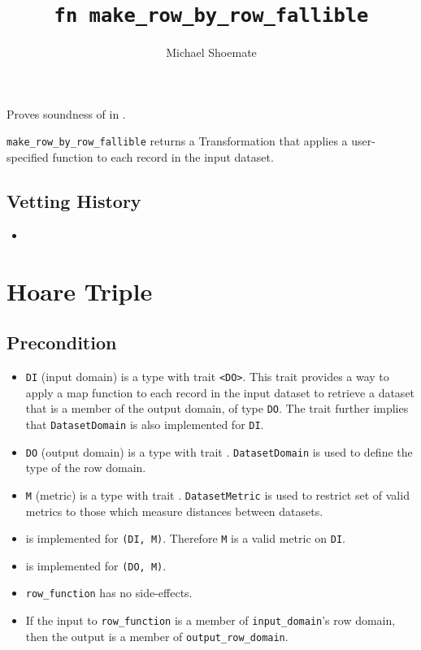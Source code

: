 \documentclass{article}
\title{\texttt{fn make\_row\_by\_row\_fallible}}
\author{Michael Shoemate}
\date{}
\begin{document}
\maketitle

\contrib
Proves soundness of  in .

\texttt{make\_row\_by\_row\_fallible} returns a Transformation that applies a user-specified function to each record in the input dataset.

\subsection*{Vetting History}
\begin{itemize}
    \item {}
\end{itemize}

\section{Hoare Triple}
\subsection*{Precondition}
\begin{itemize}

    \item \texttt{DI} (input domain) is a type with trait \texttt{<DO>}. 
        This trait provides a way to apply a map function to each record in the input dataset to retrieve a dataset that is a member of the output domain, of type \texttt{DO}. The trait further implies that \texttt{DatasetDomain} is also implemented for \texttt{DI}.
    \item \texttt{DO} (output domain) is a type with trait . 
        \texttt{DatasetDomain} is used to define the type of the row domain.
    \item \texttt{M} (metric) is a type with trait . 
        \texttt{DatasetMetric} is used to restrict set of valid metrics to those which measure distances between datasets.
    \item {} is implemented for \texttt{(DI, M)}. Therefore \texttt{M} is a valid metric on \texttt{DI}.
    \item {} is implemented for \texttt{(DO, M)}.
    \item \texttt{row\_function} has no side-effects.
    \item If the input to \texttt{row\_function} is a member of \texttt{input\_domain}'s row domain, then the output is a member of \texttt{output\_row\_domain}.
\end{itemize}
\end{document}
